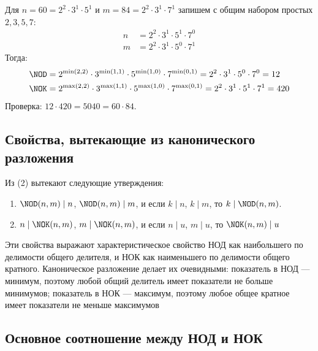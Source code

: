 \documentclass[a4paper,12pt]{article}
\theoremstyle{definition}
\theoremstyle{plain}
\theoremstyle{remark}
\begin{document}
	\begin{tcolorbox}[colback=blue!5, colframe=blue!40!black, title=Пример]
	Для $n = 60 = 2^2 \cdot 3^1 \cdot 5^1$ и $m = 84 = 2^2 \cdot 3^1 \cdot 7^1$ запишем с общим набором простых $2,3,5,7$:
	\begin{align*}
	n &= 2^2 \cdot 3^1 \cdot 5^1 \cdot 7^0 \\
	m &= 2^2 \cdot 3^1 \cdot 5^0 \cdot 7^1
	\end{align*}
	Тогда:
	\begin{align*}
	\NOD &= 2^{\min(2,2)} \cdot 3^{\min(1,1)} \cdot 5^{\min(1,0)} \cdot 7^{\min(0,1)} = 2^2 \cdot 3^1 \cdot 5^0 \cdot 7^0 = 12 \\
	\NOK &= 2^{\max(2,2)} \cdot 3^{\max(1,1)} \cdot 5^{\max(1,0)} \cdot 7^{\max(0,1)} = 2^2 \cdot 3^1 \cdot 5^1 \cdot 7^1 = 420
	\end{align*}
	Проверка: $12 \cdot 420 = 5040 = 60 \cdot 84$.
	\end{tcolorbox}
	
	\subsection{Свойства, вытекающие из канонического разложения}
	
	Из (2) вытекают следующие утверждения:
	
	\begin{enumerate}
	\item $\NOD(n, m) \mid n$, $\NOD(n, m) \mid m$, и если $k \mid n$, $k \mid m$, то $k \mid \NOD(n, m)$.
	\item $n \mid \NOK(n, m)$, $m \mid \NOK(n, m)$, и если $n \mid u$, $m \mid u$, то $\NOK(n, m) \mid u$
	\end{enumerate}
	
	\begin{tcolorbox}[colback=green!5, colframe=green!50!black, title=Пояснение]
	Эти свойства выражают характеристическое свойство НОД как наибольшего по делимости общего делителя, и НОК как наименьшего по делимости общего кратного. Каноническое разложение делает их очевидными: показатель в НОД — минимум, поэтому любой общий делитель имеет показатели не больше минимумов; показатель в НОК — максимум, поэтому любое общее кратное имеет показатели не меньше максимумов
	\end{tcolorbox}
	
	\subsection{Основное соотношение между НОД и НОК}
	
\end{document}
